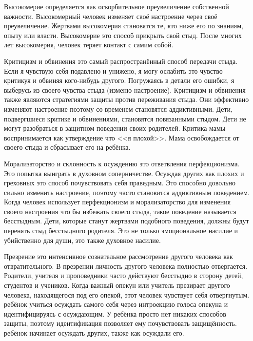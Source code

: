 \documentclass[10pt, fleqn]{article}
\begin{document}

Высокомерие определяется как оскорбительное преувеличение собственной важности. Высокомерный человек изменяет своё настроение через своё преувеличение. Жертвами высокомерия становятся те, кто ниже его по знаниям, опыту или власти.
Высокомерие это способ прикрыть свой стыд. После многих лет высокомерия, человек теряет контакт с самим собой.


Критицизм и обвинения это самый распространённый способ передачи стыда. Если я чувствую себя подавлено и унижено, я могу ослабить это чувство критикуя и обвиняя кого-нибудь другого. Погружаясь в детали его ошибки, я выберусь из своего чувства стыда (изменю настроение).
Критицизм и обвинения также являются стратегиями защиты против переживания стыда. Они эффективно изменяют настроение поэтому со временем становятся аддиктивными. Дети, подвергшиеся критике и обвинениями, становятся повязанными стыдом. Дети не могут разобраться в защитном поведении своих родителей. Критика мамы воспринимается как утверждение что <<я плохой>>. Мама освобождается от своего стыда и сбрасывает его на ребёнка.


Морализаторство и склонность к осуждению это ответвления перфекционизма. Это попытка выиграть в духовном соперничестве. Осуждая других как плохих и греховных это способ почувствовать себя праведным. Это способно довольно сильно изменить настроение, поэтому часто становится аддиктивным поведением.
Когда человек использует перфекционизм и морализаторство для изменения своего настроения что бы избежать своего стыда, такое поведение называется бесстыдным. Дети, которые станут жертвами подобного поведения, должны будут перенять стыд бесстыдного родителя. Это не только эмоциональное насилие и убийственно для души, это также духовное насилие.



Презрение это интенсивное сознательное рассмотрение другого человека как отвратительного. В презрении личность другого человека полностью отвергается.
Родители, учителя и проповедники часто действуют бесстыдно в сторону детей, студентов и учеников. Когда важный опекун или учитель презирает другого человека, находящегося под его опекой, этот человек чувствует себя отвергнутым.
ребёнок учиться осуждать самого себя через интроекцию голоса опекуна и идентифицируясь с осуждающим. У ребёнка просто нет никаких способов защиты, поэтому идентификация позволяет ему почувствовать защищённость. ребёнок начинает осуждать других, также как осуждали его.
\end{document}
